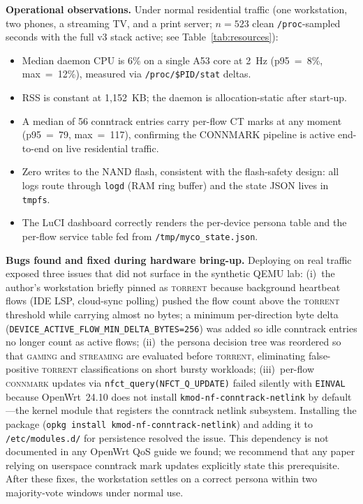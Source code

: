 \documentclass[conference]{IEEEtran}
\begin{document}
\textbf{Operational observations.}
Under normal residential traffic (one workstation, two phones, a streaming
TV, and a print server; $n{=}523$ clean \texttt{/proc}-sampled seconds with
the full v3 stack active; see Table~\ref{tab:resources}):
\begin{itemize}
  \item Median daemon CPU is 6\% on a single A53 core at 2~Hz (p95~=~8\%,
    max~=~12\%), measured via \texttt{/proc/\$PID/stat} deltas.
  \item RSS is constant at 1{,}152~KB; the daemon is allocation-static
    after start-up.
  \item A median of 56 conntrack entries carry per-flow CT marks at any
    moment (p95~=~79, max~=~117), confirming the CONNMARK pipeline is
    active end-to-end on live residential traffic.
  \item Zero writes to the NAND flash, consistent with the flash-safety
    design: all logs route through \texttt{logd} (RAM ring buffer) and
    the state JSON lives in \texttt{tmpfs}.
  \item The LuCI dashboard correctly renders the per-device persona table
    and the per-flow service table fed from
    \texttt{/tmp/myco\_state.json}.
\end{itemize}

\textbf{Bugs found and fixed during hardware bring-up.}
Deploying on real traffic exposed three issues that did not surface in
the synthetic QEMU lab:
(i)~the author's workstation briefly pinned as \textsc{torrent} because
background heartbeat flows (IDE LSP, cloud-sync polling) pushed the
flow count above the \textsc{torrent} threshold while carrying almost
no bytes; a minimum per-direction byte delta
(\texttt{DEVICE\_ACTIVE\_FLOW\_MIN\_DELTA\_BYTES=256}) was added so
idle conntrack entries no longer count as active flows;
(ii)~the persona decision tree was reordered so that \textsc{gaming}
and \textsc{streaming} are evaluated before \textsc{torrent},
eliminating false-positive \textsc{torrent} classifications on short
bursty workloads;
(iii)~per-flow \textsc{connmark} updates via \texttt{nfct\_query(NFCT\_Q\_UPDATE)}
failed silently with \texttt{EINVAL} because OpenWrt~24.10 does not
install \texttt{kmod-nf-conntrack-netlink} by default---the kernel module that
registers the conntrack netlink subsystem.
Installing the package (\texttt{opkg install kmod-nf-conntrack-netlink})
and adding it to \texttt{/etc/modules.d/} for persistence resolved the issue.
This dependency is not documented in any OpenWrt QoS guide we found;
we recommend that any paper relying on userspace conntrack mark updates
explicitly state this prerequisite.
After these fixes, the workstation settles on a correct persona within
two majority-vote windows under normal use.
\end{document}
